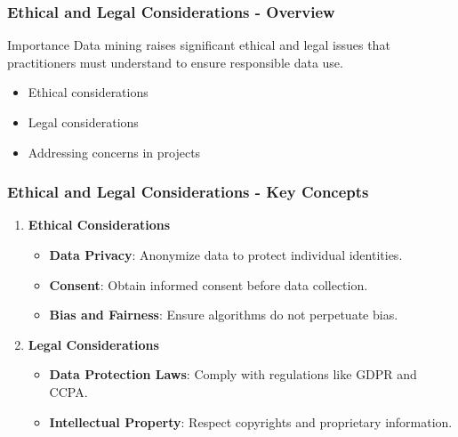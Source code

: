 \documentclass{beamer}
\begin{document}
\begin{frame}[fragile]
    \frametitle{Ethical and Legal Considerations - Overview}
    \begin{block}{Importance}
        Data mining raises significant ethical and legal issues that practitioners must understand to ensure responsible data use.
    \end{block}

    \begin{itemize}
        \item Ethical considerations
        \item Legal considerations
        \item Addressing concerns in projects
    \end{itemize}
\end{frame}

\begin{frame}[fragile]
    \frametitle{Ethical and Legal Considerations - Key Concepts}
    \begin{enumerate}
        \item \textbf{Ethical Considerations}
            \begin{itemize}
                \item \textbf{Data Privacy}: Anonymize data to protect individual identities.
                \item \textbf{Consent}: Obtain informed consent before data collection.
                \item \textbf{Bias and Fairness}: Ensure algorithms do not perpetuate bias.
            \end{itemize}
            
        \item \textbf{Legal Considerations}
            \begin{itemize}
                \item \textbf{Data Protection Laws}: Comply with regulations like GDPR and CCPA.
                \item \textbf{Intellectual Property}: Respect copyrights and proprietary information.
            \end{itemize}
    \end{enumerate}
\end{frame}
\end{document}
